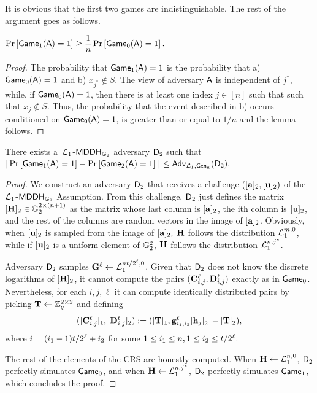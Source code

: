 It is obvious that the first two games are indistinguishable. The rest of the argument goes as follows.

\begin{lemma}
\(\Pr\left[ \mathsf{Game}_1(\mathsf{A})=1\right]\geq\dfrac{1}{n}\Pr\left[\mathsf{Game}_0(\mathsf{A})=1\right].\)
\end{lemma}

\begin{proof}  The probability that
 \(\mathsf{Game}_1(\mathsf{A})=1\) is the probability that  a) \(\mathsf{Game}_0(\mathsf{A})=1\) and
b)  \(x_{j^*} \notin S\). The view of adversary \(\mathsf{A}\) is independent of \(j^*\), while, if \(\mathsf{Game_0}(\mathsf{A})=1\), then there is at least one index \(j \in [n]\) such that  
such that  \(x_{j} \notin S\). Thus, 
the probability that the event described in b) occurs conditioned on \(\mathsf{Game_0}(\mathsf{A})=1\), is greater than or equal to \(1/n\) and the lemma follows.
\end{proof}

\begin{lemma} There exists a\ \(\mathcal{L}_1\)-\(\mathsf{MDDH}_{\mathbb{G}_2}\) adversary \(\mathsf{D}_2\) such that
\(|\Pr\left[\mathsf{Game}_{1}(\advA)=1\right]\linebreak-\Pr\left[\mathsf{Game}_{2}(\advA)=1\right]|\) \(\leq \mathsf{Adv}_{\mathcal{L}_1,\mathsf{Gen}_a}(\mathsf{D}_2).\)
\end{lemma}
\begin{proof}
We construct an adversary \(\mathsf{D}_2\) that receives 
a challenge \(([\mathbf{a}]_2,[\mathbf{u}]_2)\) of the 
\(\mathcal{L}_1\)-\(\mathsf{MDDH}_{\mathbb{G}_2}\) Assumption. From this challenge, \(\mathsf{D}_2\) just defines the matrix  \([\mathbf{{H}}]_2\in\mathbb{G}_2^{2\times(n+1)}\) as the matrix whose last column is \([\mathbf{a}]_2\), the ith column is \([\mathbf{u}]_2\), and the rest of the columns are random vectors in the image of \([\mathbf{a}]_2\). 
Obviously, when \([\mathbf{u}]_2\) is sampled from 
the image of \([\mathbf{a}]_2,\) \(\mathbf{{H}}\) follows the distribution \(\mathcal{L}_1^{m,0}\), while if \([\mathbf{u}]_2\) is a uniform element of \(\mathbb{G}^2_2\), \(\mathbf{{H}}\) follows the distribution \(\mathcal{L}_1^{n,j^*}\). 
 
Adversary \(\mathsf{D}_2\) samples
\(\mathbf{{G}}^\ell \gets \mathcal{L}_1^{nt /2^\ell,0}\). Given that \(\mathsf{D}_2\) does not know the discrete logarithms of \([\mathbf{{H}}]_2\), it cannot compute the pairs \((\mathbf{{C}}^\ell_{i,j},\mathbf{{D}}^\ell_{i,j})\) exactly as in \(\mathsf{Game}_0\). Nevertheless, for each \(i,j,\ell\) it can compute identically distributed pairs by picking \(\mathbf{{T}}\gets\mathbb{Z}_q^{2\times 2}\) and defining
\[
([\mathbf{{C}}^\ell_{i,j}]_1,[\mathbf{{D}}^\ell_{i,j}]_2):=([\mathbf{{T}}]_1,\mathbf{g}_{i_1,i_2}^\ell[\mathbf{h}_j]_2^\top-[\mathbf{{T}}]_2),
\]
where \(i=(i_1-1)t /2^\ell+i_2\) for some \(1\leq i_1\leq n,1\leq i_2 \leq t /2^\ell\).

The rest of the elements of the CRS are honestly computed. When \(\mathbf{{H}}\gets\mathcal{L}_1^{n,0}\), \(\mathsf{D}_2\) perfectly simulates \(\mathsf{Game}_0\), and when \(\mathbf{{H}}\gets\mathcal{L}_1^{n,j^*}\), \(\mathsf{D}_2\) perfectly simulates \(\mathsf{Game}_1\), which concludes the proof. 
\end{proof}

